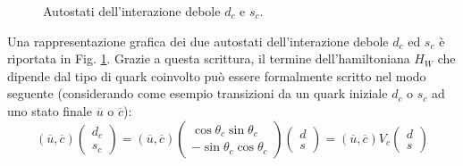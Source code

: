 \documentclass{subnucbo}
\begin{document}
\begin{figure}[t]
        \centering
        \caption{Autostati dell'interazione debole $d_{c}$ e $s_{c}$.}
        \label{fig:sdmixing}
\end{figure}
Una rappresentazione grafica dei due autostati dell'interazione debole $d_{c}$ ed $s_{c}$ è riportata in Fig. \ref{fig:sdmixing}. Grazie a questa scrittura, il termine dell'hamiltoniana $H_{W}$ che dipende dal tipo di quark coinvolto può essere formalmente scritto nel modo seguente (considerando come esempio transizioni da un quark iniziale $d_{c}$ o $s_{c}$ ad uno stato finale $\overline{u}$ o $\overline{c}$):
\begin{equation}
        ( \overline { u } , \overline { c } ) \left( \begin{array} { c } { d _ { c } } \\ { s _ { c } } \end{array} \right) = ( \overline { u } , \overline { c } ) \left( \begin{array} { c } { \operatorname { c o s } \theta _ { c } \operatorname { s i n } \theta _ { c } } \\ { - \operatorname { s i n } \theta _ { c } \operatorname { c o s } \theta _ { c } } \end{array} \right) \left( \begin{array} { l } { d } \\ { s } \end{array} \right) = ( \overline { u } , \overline { c } ) V _ { c } \left( \begin{array} { l } { d } \\ { s } \end{array} \right)
\end{equation}
\end{document}
